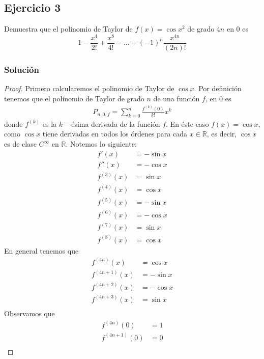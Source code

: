 \documentclass[a4paper]{article}
\begin{document}
\subsection{Ejercicio 3}
\noindent
Demuestra que el polinomio de Taylor de \(f(x) = \cos{x^2}\) de grado \(4n\) en 0 es
\[
    1 - \frac{x^4}{2!} + \frac{x^8}{4!} - \dotsc + (-1)^{n}\frac{x^{4n}}{(2n)!}
\]
\subsubsection*{Solución}
\begin{proof}
    Primero calcularemos el polinomio de Taylor de \(\cos{x}\).
    Por definición tenemos que el polinomio de Taylor de grado \(n\) de una función \(f\), en \(0\)
    es
    \begin{align*}
        P_{n, 0, f} = \sum_{k = 0}^{n} \frac{f^{(k)}(0)}{k!}x^{k}
    \end{align*}
    donde \(f^{(k)}\) es la \(k-\)ésima derivada de la función \(f\). En éste caso 
    \(f(x) = \cos{x}\), como \(\cos{x}\) tiene derivadas en todos los órdenes para cada 
    \(x \in \mathbb{R}\), es decir, \(\cos{x}\) es de clase \(C^{\infty}\) en \(\mathbb{R}\).
    \newline 
    Notemos lo siguiente:
    \begin{align*}
        f'(x) &= -\sin{x} \\
        f''(x) &= -\cos{x} \\
        f^{(3)}(x) &= \sin{x} \\
        f^{(4)}(x) &= \cos{x} \\
        f^{(5)}(x) &= -\sin{x} \\
        f^{(6)}(x) &= -\cos{x} \\
        f^{(7)}(x) &= \sin{x} \\
        f^{(8)}(x) &= \cos{x}
    \end{align*}
    En general tenemos que
    \begin{align*}
        f^{(4n)}(x) &= \cos{x} \\
        f^{(4n + 1)}(x) &= -\sin{x} \\
        f^{(4n + 2)}(x) &= -\cos{x} \\
        f^{(4n + 3)}(x) &= \sin{x} \\
    \end{align*}
    Observamos que
    \begin{align*}
        f^{(4n)}(0) &= 1 \\
        f^{(4n + 1)}(0) &= 0 \\

\end{align*}
\end{proof}
\end{document}
